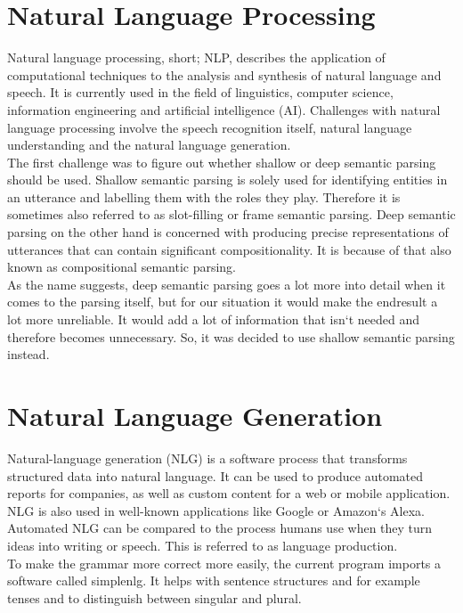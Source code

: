 \documentclass[main.tex]{subfiles}
\begin{document}
	 \section{Natural Language Processing}
	Natural language processing, short; NLP, describes the application of computational techniques to the analysis and synthesis of natural language and speech. It is currently used in the field of linguistics, computer science, information engineering and artificial intelligence (AI). Challenges with natural language processing involve the speech recognition itself, natural language understanding and the natural language generation.\\ 
The first challenge was to figure out whether shallow or deep semantic parsing should be used. Shallow semantic parsing is solely used for identifying entities in an utterance and labelling them with the roles they play. Therefore it is sometimes also referred to as slot-filling or frame semantic parsing. Deep semantic parsing on the other hand is concerned with producing precise representations of utterances that can contain significant compositionality. It is because of that also known as compositional semantic parsing.\\ 
As the name suggests, deep semantic parsing goes a lot more into detail when it comes to the parsing itself, but for our situation it would make the endresult a lot more unreliable. It would add a lot of information that isn‘t needed and therefore becomes unnecessary. So, it was decided to use shallow semantic parsing instead.

	\section{Natural Language Generation}
	Natural-language generation (NLG) is a software process that transforms structured data into natural language. It can be used to produce automated reports for companies, as well as custom content for a web or mobile application. NLG is also used in well-known applications like Google or Amazon‘s Alexa.\\
Automated NLG can be compared to the process humans use when they turn ideas into writing or speech. This is referred to as language production.\\
To make the grammar more correct more easily, the current program imports a software called simplenlg. It helps with sentence structures and for example tenses and to distinguish between singular and plural.\\
\end{document}
